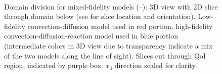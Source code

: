 \documentclass[review,sort&compress]{elsarticle}
\theoremstyle{plain} %
\theoremstyle{definition} %
\begin{document}
\begin{figure}[htbp]
{\label{subfig:3DMF2}
} 
\hfill
{} \\
\hfill
{}

\caption{Domain division for mixed-fidelity models (\protect{}--\protect{}): 3D view with 2D slice through domain below (see \protect{} for slice location and orientation). Low-fidelity convection-diffusion model used in red portion, high-fidelity convection-diffusion-reaction model used in blue portion (intermediate colors in 3D view due to transparency indicate a mix of the two models along the line of sight). Slices cut through QoI region, indicated by purple box. $x_3$ direction scaled for clarity.}
\label{fig:divvy3D_diffmesh}
\end{figure}
%
\end{document}
